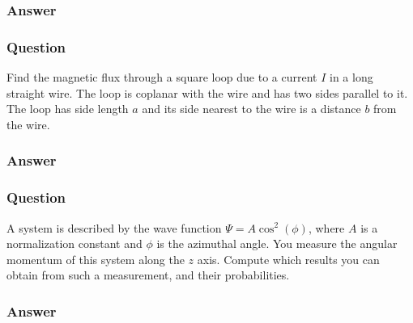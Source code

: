 \subsubsection{Answer}



\subsubsection{Question}
Find the magnetic flux through a square loop due to a current $I$ in a long straight wire. The loop is coplanar with the wire and has two sides parallel to it. The loop has side length $a$ and its side nearest to the wire is a distance $b$ from the wire.
\subsubsection{Answer}



\subsubsection{Question}
A system is described by the wave function $\Psi = A \cos^2(\phi)$, where $A$ is a normalization constant and $\phi$ is the azimuthal angle. You measure the angular momentum of this system along the $z$ axis. Compute which results you can obtain from such a measurement, and their probabilities.
\subsubsection{Answer}


